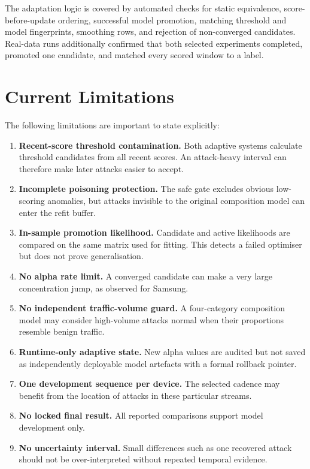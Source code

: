 \documentclass[11pt,a4paper]{article}
\begin{document}
The adaptation logic is covered by automated checks for static equivalence,
score-before-update ordering, successful model promotion, matching threshold
and model fingerprints, smoothing rows, and rejection of non-converged
candidates. Real-data runs additionally confirmed that both selected
experiments completed, promoted one candidate, and matched every scored window
to a label.

\section{Current Limitations}

The following limitations are important to state explicitly:

\begin{enumerate}
  \item \textbf{Recent-score threshold contamination.} Both adaptive systems
  calculate threshold candidates from all recent scores. An attack-heavy
  interval can therefore make later attacks easier to accept.
  \item \textbf{Incomplete poisoning protection.} The safe gate excludes
  obvious low-scoring anomalies, but attacks invisible to the original
  composition model can enter the refit buffer.
  \item \textbf{In-sample promotion likelihood.} Candidate and active
  likelihoods are compared on the same matrix used for fitting. This detects a
  failed optimiser but does not prove generalisation.
  \item \textbf{No alpha rate limit.} A converged candidate can make a very
  large concentration jump, as observed for Samsung.
  \item \textbf{No independent traffic-volume guard.} A four-category
  composition model may consider high-volume attacks normal when their
  proportions resemble benign traffic.
  \item \textbf{Runtime-only adaptive state.} New alpha values are audited but
  not saved as independently deployable model artefacts with a formal rollback
  pointer.
  \item \textbf{One development sequence per device.} The selected cadence may
  benefit from the location of attacks in these particular streams.
  \item \textbf{No locked final result.} All reported comparisons support model
  development only.
  \item \textbf{No uncertainty interval.} Small differences such as one
  recovered attack should not be over-interpreted without repeated temporal
  evidence.
\end{enumerate}
\end{document}
